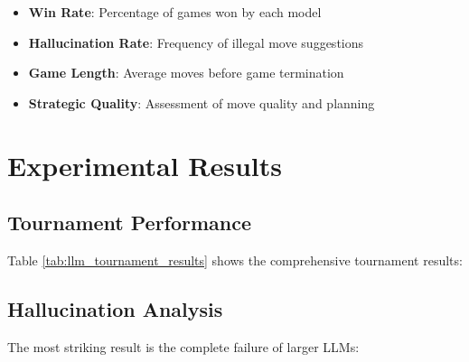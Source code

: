 \documentclass[11pt,a4paper]{report}
\begin{document}
\begin{itemize}
    \item \textbf{Win Rate}: Percentage of games won by each model
    \item \textbf{Hallucination Rate}: Frequency of illegal move suggestions
    \item \textbf{Game Length}: Average moves before game termination
    \item \textbf{Strategic Quality}: Assessment of move quality and planning
\end{itemize}

\section{Experimental Results}

\subsection{Tournament Performance}
Table \ref{tab:llm_tournament_results} shows the comprehensive tournament results:


\begin{table}[H]
\caption{LLM Tournament Results (15 games as White + 15 games as Black per matchup)}
\label{tab:llm_tournament_results}
\begin{center}
\end{center}
\end{table}

\subsection{Hallucination Analysis}
The most striking result is the complete failure of larger LLMs:
\end{document}
